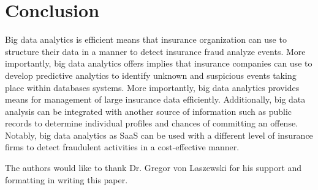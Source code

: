 \documentclass[sigconf]{acmart}
\begin{document}
\section{Conclusion}

Big data analytics is efficient means that insurance organization can use to structure their data in a manner to detect insurance fraud analyze events. More importantly, big data analytics offers implies that insurance companies can use to develop predictive analytics to identify unknown and suspicious events taking place within databases systems. More importantly, big data analytics provides means for management of large insurance data efficiently. Additionally, big data analysis can be integrated with another source of information such as public records to determine individual profiles and chances of committing an offense. Notably, big data analytics as SaaS can be used with a different level of insurance firms to detect fraudulent activities in a cost-effective manner.
\begin{acks}

The authors would like to thank Dr. Gregor von Laszewski for his support and formatting in writing this paper.

\end{acks}

 
\end{document}
